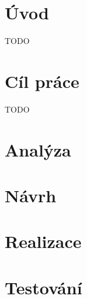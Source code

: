 
\graphicspath{ {./images} }

\chapter*{Úvod}
\setcounter{page}{1}

TODO

\chapter{Cíl práce}

TODO

\chapter{Analýza}



\chapter{Návrh}

% 

\chapter{Realizace}

% 

\chapter{Testování}


